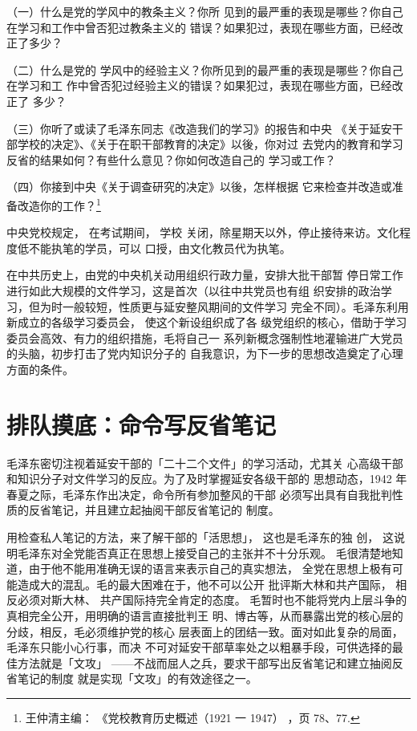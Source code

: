 （一）什么是党的学风中的教条主义？你所
见到的最严重的表现是哪些？你自己在学习和工作中曾否犯过教条主义的
错误？如果犯过，表现在哪些方面，已经改正了多少？

（二）什么是党的
学风中的经验主义？你所见到的最严重的表现是哪些？你自己在学习和工
作中曾否犯过经验主义的错误？如果犯过，表现在哪些方面，已经改正了
多少？

（三）你听了或读了毛泽东同志《改造我们的学习》的报告和中央
《关于延安干部学校的决定》、《关于在职干部教育的决定》以後，你对过
去党内的教育和学习反省的结果如何？有些什么意见？你如何改造自己的
学习或工作？

（四）你接到中央《关于调查研究的决定》以後，怎样根据
它来检查并改造或准备改造你的工作？\footnote{王仲清主编：
《党校教育历史概述（1921 一 1947）
，页 78、77.}

中央党校规定，
在考试期间，
学校
关闭，除星期天以外，停止接待来访。文化程度低不能执笔的学员，可以
口授，由文化教员代为执笔。

在中共历史上，由党的中央机关动用组织行政力量，安排大批干部暂
停日常工作进行如此大规模的文件学习，这是首次（以往中共党员也有组
织安排的政治学习，但为时一般较短，性质更与延安整风期间的文件学习
完全不同）。毛泽东利用新成立的各级学习委员会，
使这个新设组织成了各
级党组织的核心，借助于学习委员会高效、有力的组织措施，毛将自己一
系列新概念强制性地灌输进广大党员的头脑，初步打击了党内知识分子的
自我意识，为下一步的思想改造奠定了心理方面的条件。

\section{排队摸底：命令写反省笔记}
毛泽东密切注视着延安干部的「二十二个文件」的学习活动，尤其关
心高级干部和知识分子对文件学习的反应。为了及时掌握延安各级干部的
思想动态，1942 年春夏之际，毛泽东作出决定，命令所有参加整风的干部
必须写出具有自我批判性质的反省笔记，并且建立起抽阅干部反省笔记的
制度。

用检查私人笔记的方法，来了解干部的「活思想」，
这也是毛泽东的独
创，
这说明毛泽东对全党能否真正在思想上接受自己的主张并不十分乐观。
毛很清楚地知道，由于他不能用准确无误的语言来表示自己的真实想法，
全党在思想上极有可能造成大的混乱。毛的最大困难在于，他不可以公开
批评斯大林和共产国际，
相反必须对斯大林、
共产国际持完全肯定的态度。
毛暂时也不能将党内上层斗争的真相完全公开，用明确的语言直接批判王
明、博古等，从而暴露出党的核心层的分歧，相反，毛必须维护党的核心
层表面上的团结一致。面对如此复杂的局面，毛泽东只能小心行事，而决
不可对延安干部草率处之以粗暴手段，可供选择的最佳方法就是「文攻」
——不战而屈人之兵，要求干部写出反省笔记和建立抽阅反省笔记的制度
就是实现「文攻」的有效途径之一。
 
